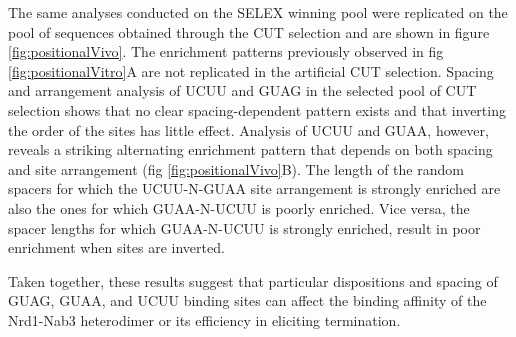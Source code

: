 The same analyses conducted on the \invitro{} SELEX winning pool were replicated on the pool of sequences obtained through the \invivo{} CUT selection and are shown in figure \ref{fig:positionalVivo}. The enrichment patterns previously observed in fig \ref{fig:positionalVitro}A are not replicated in the artificial CUT selection. Spacing and arrangement analysis of UCUU and GUAG in the selected pool of \invivo{} CUT selection shows that no clear spacing-dependent pattern exists and that inverting the order of the sites has little effect. Analysis of UCUU and GUAA, however, reveals a striking alternating enrichment pattern that depends on both spacing and site arrangement (fig \ref{fig:positionalVivo}B). The length of the random spacers for which the UCUU-N-GUAA site arrangement is strongly enriched are also the ones for which GUAA-N-UCUU is poorly enriched. Vice versa, the spacer lengths for which GUAA-N-UCUU is strongly enriched, result in poor enrichment when sites are inverted. 

Taken together, these results suggest that particular dispositions and spacing of GUAG, GUAA, and UCUU binding sites can affect the binding affinity of the Nrd1-Nab3 heterodimer or its efficiency in eliciting termination. 

